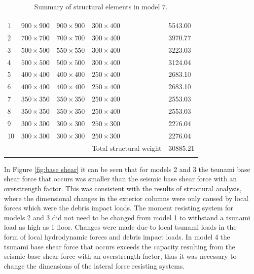 \documentclass{cup-pan}
\begin{document}
\renewcommand{\arraystretch}{1}
\begin{longtable}{P{0.5in} P{1in} P{1in} P{1in} P{1in}}
\caption{Summary of structural elements in model 7.}\\
\headrow {} &  &  &  &  \\
1 & $900\times900$ & $900\times900$ & $300\times400$ & \num{5543.00} \\
2 & $700\times700$ & $700\times700$ & $300\times400$ & \num{3970.77} \\
3 & $500\times500$ & $550\times550$ & $300\times400$ & \num{3223.03} \\
4 & $500\times500$ & $500\times500$ & $300\times400$ & \num{3124.04} \\
5 & $400\times400$ & $400\times400$ & $250\times400$ & \num{2683.10} \\
6 & $400\times400$ & $400\times400$ & $250\times400$ & \num{2683.10} \\
7 & $350\times350$ & $350\times350$ & $250\times400$ & \num{2553.03} \\
8 & $350\times350$ & $350\times350$ & $250\times400$ & \num{2553.03} \\
9 & $300\times300$ & $300\times300$ & $250\times300$ & \num{2276.04} \\
10 & $300\times300$ & $300\times300$ & $250\times300$ & \num{2276.04} \\
 &  & & Total structural weight & \num{30885.21} \\
\label{tab:cross section model 7}
\end{longtable}

In Figure \ref{fig:base shear} it can be seen that for models 2 and 3 the tsunami base shear force that occurs was smaller than the seismic base shear force with an overstrength factor. This was consistent with the results of structural analysis, where the dimensional changes in the exterior columns were only caused by local forces which were the debris impact loads. The moment resisting system for models 2 and 3 did not need to be changed from model 1 to withstand a tsunami load as high as 1 floor. Changes were made due to local tsunami loads in the form of local hydrodynamic forces and debris impact loads. In model 4 the tsunami base shear force that occurs exceeds the capacity resulting from the seismic base shear force with an overstrength factor, thus it was necessary to change the dimensions of the lateral force resisting systems.
\end{document}
